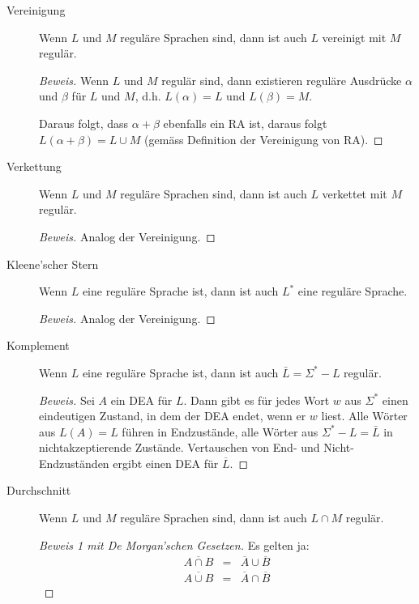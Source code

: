 \documentclass[11pt]{article} %
\theoremstyle{definition}
\begin{document}
\begin{description}
\item[Vereinigung] Wenn $L$ und $M$ reguläre Sprachen sind, dann ist auch $L$ vereinigt mit $M$ regulär.
\begin{proof}[Beweis]
Wenn $L$ und $M$ regulär sind, dann existieren reguläre Ausdrücke $\alpha$ und $\beta$ für $L$ und $M$, d.h. $L(\alpha) = L$ und $L(\beta) = M$.

Daraus folgt, dass $\alpha + \beta$ ebenfalls ein RA ist, daraus folgt $L(\alpha + \beta) = L \cup M$ (gemäss Definition der Vereinigung von RA).
\end{proof}

\item[Verkettung] Wenn $L$ und $M$ reguläre Sprachen sind, dann ist auch $L$ verkettet mit $M$ regulär.
\begin{proof}[Beweis]
Analog der Vereinigung.
\end{proof}

\item[Kleene'scher Stern] Wenn $L$ eine reguläre Sprache ist, dann ist auch $L^*$ eine reguläre Sprache.
\begin{proof}[Beweis]
Analog der Vereinigung.
\end{proof}

\item[Komplement] Wenn $L$ eine reguläre Sprache ist, dann ist auch $\bar{L} = \Sigma^* - L$ regulär.

\begin{proof}[Beweis]
Sei $A$ ein DEA für $L$. Dann gibt es für jedes Wort $w$ aus $\Sigma^*$ einen eindeutigen Zustand, in dem der DEA endet, wenn er $w$ liest. Alle Wörter aus $L(A) = L$ führen in Endzustände, alle Wörter aus $\Sigma^* - L = \bar{L}$ in nichtakzeptierende Zustände. Vertauschen von End- und Nicht-Endzuständen ergibt einen DEA für $\overline{L}$.
\end{proof}

\item[Durchschnitt] Wenn $L$ und $M$ reguläre Sprachen sind, dann ist auch $L\cap M$ regulär.

\begin{proof}[Beweis 1 mit De Morgan'schen Gesetzen]
Es gelten ja:
\begin{eqnarray}
\overline{A \cap B} &=& \overline{A} \cup  \overline{B} \\
\overline{A \cup B} &=& \overline{A} \cap  \overline{B} 
\end{eqnarray}


\end{proof}
\end{description}
\end{document}
